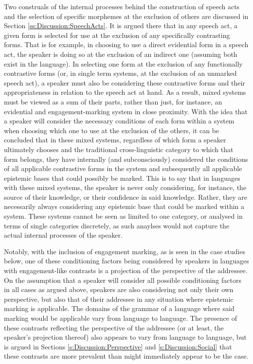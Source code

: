 Two construals of the internal processes behind the construction of speech acts and the selection of specific morphemes at the exclusion of others are discussed in Section \ref{ss:Discussion:SpeechActs}. It is argued there that in any speech act, a given form is selected for use at the exclusion of any specifically contrasting forms. That is for example, in choosing to use a direct evidential form in a speech act, the speaker is doing so at the exclusion of an indirect one (assuming both exist in the language). In selecting one form at the exclusion of any functionally contrastive forms (or, in single term systems, at the exclusion of an unmarked speech act), a speaker must also be considering these contrastive forms and their appropriateness in relation to the speech act at hand. As a result, mixed systems must be viewed as a sum of their parts, rather than just, for instance, an evidential and engagement-marking system in close proximity. With the idea that a speaker will consider the necessary conditions of each form within a system when choosing which one to use at the exclusion of the others, it can be concluded that in these mixed systems, regardless of which form a speaker ultimately chooses and the traditional cross-linguistic category to which that form belongs, they have internally (and subconsciously) considered the conditions of all applicable contrastive forms in the system and subsequently all applicable epistemic bases that could possibly be marked. This is to say that in languages with these mixed systems, the speaker is never only considering, for instance, the source of their knowledge, or their confidence in said knowledge. Rather, they are necessarily always considering any epistemic base that could be marked within a system. These systems cannot be seen as limited to one category, or analysed in terms of single categories discretely, as such anaylses would not capture the actual internal processes of the speaker.

Notably, with the inclusion of engagement marking, as is seen in the case studies below, one of these conditioning factors being considered by speakers in languages with engagement-like contrasts is a projection of the perspective of the addressee. On the assumption that a speaker will consider all possible conditioning factors in all cases as argued above, speakers are also considering not only their own perspective, but also that of their addressee in any situation where epistemic marking is applicable. The domains of the grammar of a language where said marking would be applicable vary from language to language. The presence of these contrasts reflecting the perspective of the addressee (or at least, the speaker's projection thereof) also appears to vary from language to language, but is argued in Sections \ref{s:Discussion:Perspective} and \ref{s:Discussion:Social} that these contrasts are more prevalent than might immediately appear to be the case.

